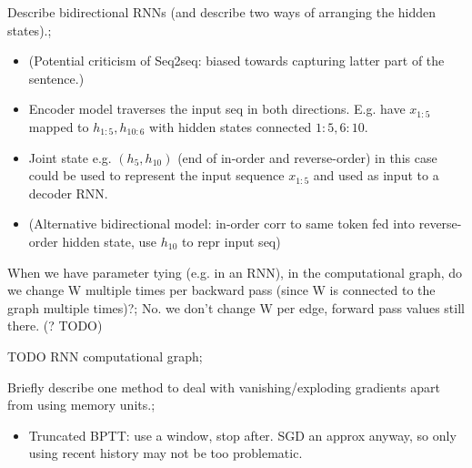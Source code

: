 \documentclass{article}
\begin{document}
Describe bidirectional RNNs (and describe two ways of arranging the hidden states).; \begin{itemize}
    \item (Potential criticism of Seq2seq: biased towards capturing latter part of the sentence.)
    \item Encoder model traverses the input seq in both directions. E.g. have $x_{1:5}$ mapped to $h_{1:5}, h_{10:6}$ with hidden states connected $1:5, 6:10$. 
    \item Joint state e.g. $(h_5, h_{10})$ (end of in-order and reverse-order) in this case could be used to represent the input sequence $x_{1:5}$ and used as input to a decoder RNN.
    \item (Alternative bidirectional model: in-order corr to same token fed into reverse-order hidden state, use $h_{10}$ to repr input seq)
\end{itemize}

When we have parameter tying (e.g. in an RNN), in the computational graph, do we change W multiple times per backward pass (since W is connected to the graph multiple times)?; No. we don't change W per edge, forward pass values still there. (? TODO)

TODO RNN computational graph; 

Briefly describe one method to deal with vanishing/exploding gradients apart from using memory units.; \begin{itemize}
    \item Truncated BPTT: use a window, stop after. SGD an approx anyway, so only using recent history may not be too problematic.
\end{itemize}
\end{document}
